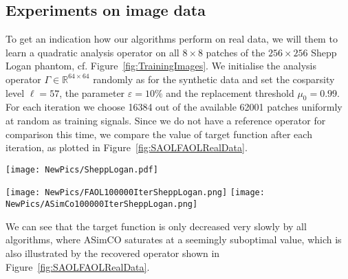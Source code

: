 \documentclass[11pt, onecolumn, journal,compsoc]{IEEEtran}
\newcommand\eps{\varepsilon}
\newcommand{\R}{{\mathbb{R}}}
\theoremstyle{plain}
\theoremstyle{remark}
\begin{document}
\subsection{Experiments on image data}\label{sec:StupidRealData}
To get an indication how our algorithms perform on real data, we will them to learn a quadratic analysis operator on all $8\times 8$ patches of the $256\times 256$ Shepp Logan phantom, cf. Figure~\ref{fig:TrainingImages}. We initialise the analysis operator $\Gamma\in\R^{64\times 64}$ randomly as for the synthetic data and set the cosparsity level $\ell= 57$, the parameter $\eps=10\%$ and the replacement threshold $\mu_0=0.99$. For each iteration we choose 16384 out of the available 62001 patches uniformly at random as training signals. Since we do not have a reference operator for comparison this time, we compare the value of target function after each iteration, as plotted in Figure~\ref{fig:SAOLFAOLRealData}.
%
\begin{figure*}[!hb]
	\begin{center}
		\texttt{[image: NewPics/SheppLogan.pdf]}
		\quad
		\qquad
		\texttt{[image: NewPics/FAOL100000IterSheppLogan.png]}
		\texttt{[image: NewPics/ASimCo100000IterSheppLogan.png]}
		\caption{Shepp Logan phantom (1st), value of the target function for both algorithms (2nd), operator obtained by FAOL (3rd) and by ASimCo (4th) after 100000(!) iterations.}
		\label{fig:SAOLFAOLRealData}
	\end{center}
\end{figure*} 
%
We can see that the target function is only decreased very slowly by all algorithms, where ASimCO saturates at a seemingly suboptimal value, which is also illustrated by the recovered operator shown in Figure~\ref{fig:SAOLFAOLRealData}.
\end{document}
